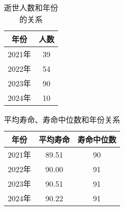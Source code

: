\documentclass[twocolumn]{article}
\begin{document}
\begin{table}[!ht]
    \centering
    \begin{tabular}{c|c}
        \textbf{年份} & \textbf{人数} \\ \hline
        2021年 & 39 \\ 
        2022年 & 54 \\ 
        2023年 & 90 \\ 
        2024年 & 10 \\ 
    \end{tabular}
    \caption{逝世人数和年份的关系}
\end{table}
\begin{table}[!ht]
    \centering
    \begin{tabular}{c|c|c}
        \textbf{年份} & \textbf{平均寿命} & \textbf{寿命中位数} \\ \hline
        2021年 & 89.51 & 90 \\ 
        2022年 & 90.00 & 91 \\ 
        2023年 & 90.51 & 91 \\ 
        2024年 & 90.22 & 91 \\ 
    \end{tabular}
    \caption{平均寿命、寿命中位数和年份关系}
\end{table}
\end{document}

